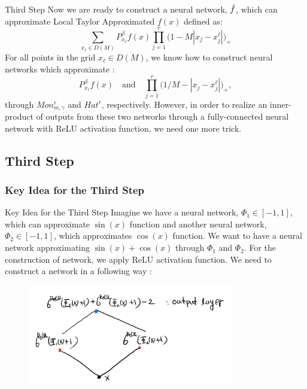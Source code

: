 \documentclass{if-beamer}
\begin{document}
\begin{frame}{Third Step}
    Now we are ready to construct a neural network, $\Tilde{f}$, which can approximate Local Taylor Approximated $f(x)$ defined as:
    \begin{equation*}
        \sum_{x_{\ell}\in D(M)}P_{x_{\ell}}^{\beta}f(x)\prod_{j=1}^{r}\bigg( 1- M|x_{j}-x_{j}^{\ell}| \bigg)_{+} 
    \end{equation*}
    For all points in the grid $x_{\ell}\in D(M)$, we know how to construct neural networks which approximate : 
    \begin{equation*}
        P_{x_{\ell}}^{\beta}f(x) \quad \text{and} \quad \prod_{j=1}^{r}\big( 1/M - |x_{j}-x_{j}^{\ell}| \big)_{+},
    \end{equation*}
    through $Mon_{m,\gamma}^{r}$ and $Hat^{r}$, respectively.
    However, in order to realize an inner-product of outputs from these two networks through a fully-connected neural network with ReLU activation function, we need one more trick.
\end{frame}

\subsection{Third Step}
\subsubsection{Key Idea for the Third Step}
\begin{frame}{Key Idea for the Third Step}
    Imagine we have a neural network, $\Phi_{1}\in [-1,1]$, which can approximate $\sin(x)$ function and  another neural network, $\Phi_{2}\in [-1,1]$, which approximates $\cos(x)$ function. 
    We want to have a neural network approximating $\sin(x)+\cos(x)$ through $\Phi_{1}$ and $\Phi_{2}$. For the construction of network, we apply ReLU activation function. 
    We need to construct a network in a following way : 
    \begin{figure}[htbp]
        \includegraphics[width=0.8\textwidth]{Shift_Scale.png}
    \label{fig:figure7}
\end{figure}
\end{frame}
\end{document}
